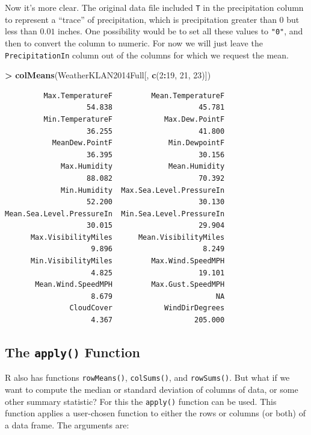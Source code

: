 \documentclass[]{krantz}
\makeatletter
\newenvironment{Shaded}{\begin{snugshade}}{\end{snugshade}}
\newcommand{\DecValTok}[1]{\textcolor[rgb]{0.06,0.06,0.06}{#1}}
\newcommand{\KeywordTok}[1]{\textcolor[rgb]{0.27,0.27,0.27}{\textbf{#1}}}
\newcommand{\NormalTok}[1]{#1}
\newcommand{\OperatorTok}[1]{\textcolor[rgb]{0.43,0.43,0.43}{\textbf{#1}}}
\newcommand{\StringTok}[1]{\textcolor[rgb]{0.5,0.5,0.5}{#1}}
\newenvironment{kframe}{%
\medskip{}
\setlength{\fboxsep}{.8em}
 \def\at@end@of@kframe{}%
 \ifinner\ifhmode%
  \def\at@end@of@kframe{\end{minipage}}%
  \begin{minipage}{\columnwidth}%
 \fi\fi%
 \def\FrameCommand##1{\hskip\@totalleftmargin \hskip-\fboxsep
 \colorbox{shadecolor}{##1}\hskip-\fboxsep
     \hskip-\linewidth \hskip-\@totalleftmargin \hskip\columnwidth}%
 \MakeFramed {\advance\hsize-\width
   \@totalleftmargin\z@ \linewidth\hsize
   \@setminipage}}%
 {\par\unskip\endMakeFramed%
 \at@end@of@kframe}
\renewenvironment{Shaded}{\begin{kframe}}{\end{kframe}}
\makeatother
\begin{document}
Now it's more clear. The original data file included \texttt{T} in the precipitation column to represent a ``trace'' of precipitation, which is precipitation greater than \(0\) but less than \(0.01\) inches. One possibility would be to set all these values to \texttt{"0"}, and then to convert the column to numeric. For now we will just leave the \texttt{PrecipitationIn} column out of the columns for which we request the mean.

\begin{Shaded}
\begin{Highlighting}[]
\OperatorTok{>}\StringTok{ }\KeywordTok{colMeans}\NormalTok{(WeatherKLAN2014Full[, }\KeywordTok{c}\NormalTok{(}\DecValTok{2}\OperatorTok{:}\DecValTok{19}\NormalTok{, }\DecValTok{21}\NormalTok{, }\DecValTok{23}\NormalTok{)])}
\end{Highlighting}
\end{Shaded}

\begin{verbatim}
         Max.TemperatureF         Mean.TemperatureF 
                   54.838                    45.781 
         Min.TemperatureF            Max.Dew.PointF 
                   36.255                    41.800 
           MeanDew.PointF             Min.DewpointF 
                   36.395                    30.156 
             Max.Humidity             Mean.Humidity 
                   88.082                    70.392 
             Min.Humidity  Max.Sea.Level.PressureIn 
                   52.200                    30.130 
Mean.Sea.Level.PressureIn  Min.Sea.Level.PressureIn 
                   30.015                    29.904 
      Max.VisibilityMiles      Mean.VisibilityMiles 
                    9.896                     8.249 
      Min.VisibilityMiles         Max.Wind.SpeedMPH 
                    4.825                    19.101 
       Mean.Wind.SpeedMPH         Max.Gust.SpeedMPH 
                    8.679                        NA 
               CloudCover            WindDirDegrees 
                    4.367                   205.000 
\end{verbatim}

\hypertarget{apply}{%
\subsection{\texorpdfstring{The \texttt{apply()} Function}{The apply() Function}}\label{apply}}

R also has functions \texttt{rowMeans()}, \texttt{colSums()}, and \texttt{rowSums()}. But what if we want to compute the median or standard deviation of columns of data, or some other summary statistic? For this the \texttt{apply()} function can be used. This function applies a user-chosen function to either the rows or columns (or both) of a data frame. The arguments are:
\end{document}
